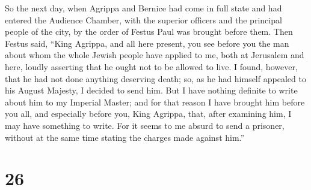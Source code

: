 So the next day, when Agrippa and Bernice had come in full
state and had entered the Audience Chamber, with the superior officers
and the principal people of the city, by the order of Festus Paul was
brought before them.  Then Festus said, ``King Agrippa, and
all here present, you see before you the man about whom the whole Jewish
people have applied to me, both at Jerusalem and here, loudly asserting
that he ought not to be allowed to live.  I found, however,
that he had not done anything deserving death; so, as he had himself
appealed to his August Majesty, I decided to send him.  But
I have nothing definite to write about him to my Imperial Master; and
for that reason I have brought him before you all, and especially before
you, King Agrippa, that, after examining him, I may have something to
write.  For it seems to me absurd to send a prisoner,
without at the same time stating the charges made against him.''

\hypertarget{section-25}{%
\section{26}\label{section-25}}

